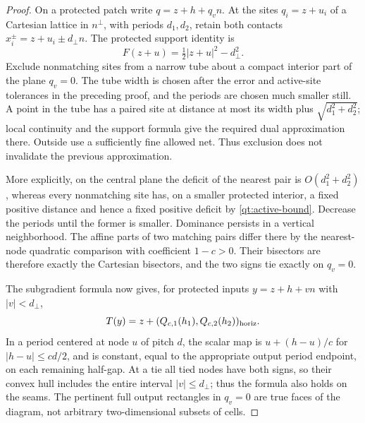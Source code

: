 \documentclass[11pt]{article}
\numberwithin{equation}{section}
\theoremstyle{definition}
\theoremstyle{remark}
\begin{document}
\begin{proof}
On a protected patch write $q=z+h+q_v n$.  At the sites $q_i=z+u_i$ of
a Cartesian lattice in $n^\perp$, with periods $d_1,d_2$, retain both
contacts $x_i^\pm=z+u_i\pm d_\perp n$.  The protected support identity is
\[
 F(z+u)=\tfrac12|z+u|^2-d_\perp^2.
\]
Exclude nonmatching sites from a narrow tube about a compact interior
part of the plane $q_v=0$.  The tube width is chosen after the error and
active-site tolerances in the preceding proof, and the periods are
chosen much smaller still.  A point in the tube has a paired site at
distance at most its width plus $\sqrt{d_1^2+d_2^2}$; local continuity
and the support formula give the required dual approximation there.
Outside use a sufficiently fine allowed net.  Thus exclusion does not
invalidate the previous approximation.

More explicitly, on the central plane the deficit of the nearest pair
is $O(d_1^2+d_2^2)$, whereas every nonmatching site has, on a smaller
protected interior, a fixed positive distance and hence a fixed
positive deficit by \eqref{qt:active-bound}.  Decrease the periods until
the former is smaller.  Dominance persists in a vertical neighborhood.
The affine parts of two matching pairs differ there by the nearest-node
quadratic comparison with coefficient $1-c>0$.  Their bisectors are
therefore exactly the Cartesian bisectors, and the two signs tie
exactly on $q_v=0$.

The subgradient formula now gives, for protected inputs
$y=z+h+vn$ with $|v|<d_\perp$,
\begin{equation}\label{qt:scalar-quantizer}
 T(y)=z+(Q_{c,1}(h_1),Q_{c,2}(h_2))_{\rm horiz}.
\end{equation}
In a period centered at node $u$ of pitch $d$, the scalar map is
$u+(h-u)/c$ for $|h-u|\leq cd/2$, and is constant, equal to the
appropriate output period endpoint, on each remaining half-gap.
At a tie all tied nodes have both signs, so their convex hull includes
the entire interval $|v|\leq d_\perp$; thus the formula also holds on
the seams.  The pertinent full output rectangles in $q_v=0$ are true
faces of the diagram, not arbitrary two-dimensional subsets of cells.


\end{proof}
\end{document}
